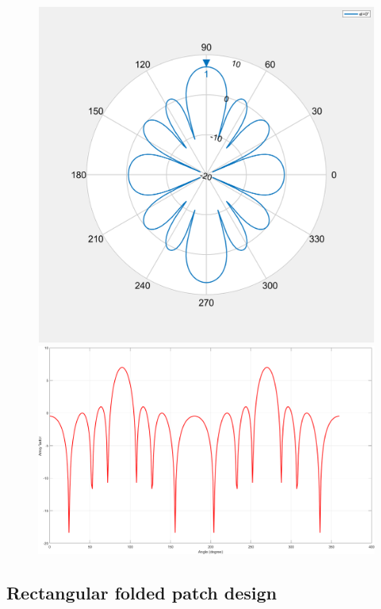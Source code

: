 \documentclass[12pt,a4paper]{book}
\begin{document}
{\begin{center}
\begin{figure}[h]
\includegraphics[scale=0.3]{array_factor_polar.png}
\includegraphics[scale=0.3]{array_factor_rectangular.png}
\end{figure}
\end{center}

\subsection*{\selectfont\color{Turquoise}Rectangular folded patch design}
}
\end{document}
